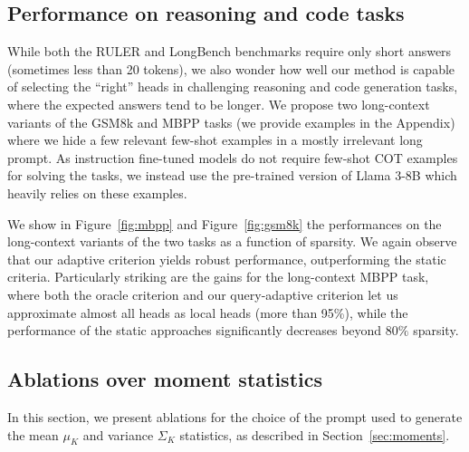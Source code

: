 \subsection{Performance on reasoning and code tasks }
While both the RULER and LongBench benchmarks require only short answers (sometimes less than 20 tokens), we also wonder how well our method is capable of selecting the ``right'' heads in challenging reasoning and code generation tasks, where the expected answers tend to be longer. 
We propose two long-context variants of the GSM8k and MBPP tasks (we provide examples in the Appendix) where we hide a few relevant few-shot examples in a mostly irrelevant long prompt. As instruction fine-tuned models do not require few-shot COT examples for solving the tasks, we instead use the pre-trained version of Llama 3-8B which heavily relies on these examples. 




We show in Figure~\ref{fig:mbpp} and Figure~\ref{fig:gsm8k} the performances on the long-context variants of the two tasks as a function of sparsity. We again observe that our adaptive criterion yields robust performance, outperforming the static criteria. Particularly striking are the gains for the long-context MBPP task, where both the oracle criterion and our query-adaptive criterion let us approximate almost all heads as local heads (more than 95\%), while the performance of the static approaches significantly decreases beyond $80\%$ sparsity.


\subsection{Ablations over moment statistics}
\label{sec:ablations}
In this section, we present  ablations for the choice of the prompt used to generate the  mean $\mu_K$ and variance $\Sigma_K$ statistics, as described in Section~\ref{sec:moments}.


